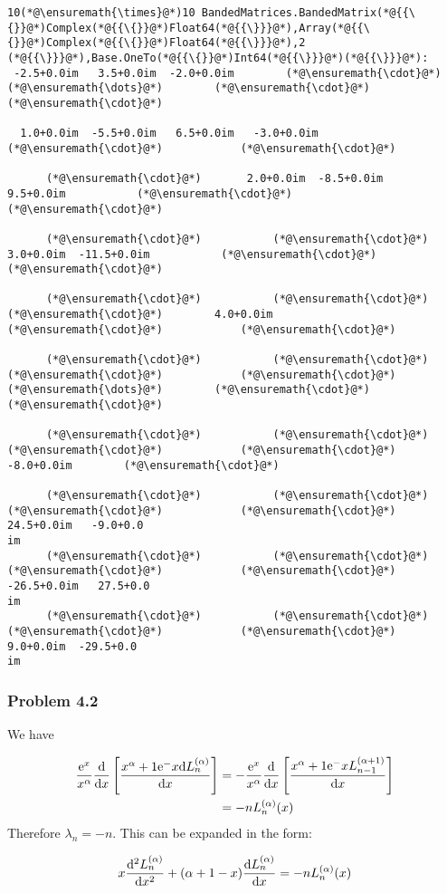 \documentclass[12pt,a4paper]{article}
\def\D{ {\rm d} }
\def\E{ {\rm e} }
\def\dx{\D x}
\def\br[#1]{\left[{#1}\right]}
\begin{document}
\begin{lstlisting}
10(*@\ensuremath{\times}@*)10 BandedMatrices.BandedMatrix(*@{{\{}}@*)Complex(*@{{\{}}@*)Float64(*@{{\}}}@*),Array(*@{{\{}}@*)Complex(*@{{\{}}@*)Float64(*@{{\}}}@*),2
(*@{{\}}}@*),Base.OneTo(*@{{\{}}@*)Int64(*@{{\}}}@*)(*@{{\}}}@*):
 -2.5+0.0im   3.5+0.0im  -2.0+0.0im        (*@\ensuremath{\cdot}@*)      (*@\ensuremath{\dots}@*)        (*@\ensuremath{\cdot}@*)            (*@\ensuremath{\cdot}@*)  
  
  1.0+0.0im  -5.5+0.0im   6.5+0.0im   -3.0+0.0im           (*@\ensuremath{\cdot}@*)            (*@\ensuremath{\cdot}@*)  
  
      (*@\ensuremath{\cdot}@*)       2.0+0.0im  -8.5+0.0im    9.5+0.0im           (*@\ensuremath{\cdot}@*)            (*@\ensuremath{\cdot}@*)  
  
      (*@\ensuremath{\cdot}@*)           (*@\ensuremath{\cdot}@*)       3.0+0.0im  -11.5+0.0im           (*@\ensuremath{\cdot}@*)            (*@\ensuremath{\cdot}@*)  
  
      (*@\ensuremath{\cdot}@*)           (*@\ensuremath{\cdot}@*)           (*@\ensuremath{\cdot}@*)        4.0+0.0im           (*@\ensuremath{\cdot}@*)            (*@\ensuremath{\cdot}@*)  
  
      (*@\ensuremath{\cdot}@*)           (*@\ensuremath{\cdot}@*)           (*@\ensuremath{\cdot}@*)            (*@\ensuremath{\cdot}@*)      (*@\ensuremath{\dots}@*)        (*@\ensuremath{\cdot}@*)            (*@\ensuremath{\cdot}@*)  
  
      (*@\ensuremath{\cdot}@*)           (*@\ensuremath{\cdot}@*)           (*@\ensuremath{\cdot}@*)            (*@\ensuremath{\cdot}@*)          -8.0+0.0im        (*@\ensuremath{\cdot}@*)  
  
      (*@\ensuremath{\cdot}@*)           (*@\ensuremath{\cdot}@*)           (*@\ensuremath{\cdot}@*)            (*@\ensuremath{\cdot}@*)          24.5+0.0im   -9.0+0.0
im
      (*@\ensuremath{\cdot}@*)           (*@\ensuremath{\cdot}@*)           (*@\ensuremath{\cdot}@*)            (*@\ensuremath{\cdot}@*)         -26.5+0.0im   27.5+0.0
im
      (*@\ensuremath{\cdot}@*)           (*@\ensuremath{\cdot}@*)           (*@\ensuremath{\cdot}@*)            (*@\ensuremath{\cdot}@*)           9.0+0.0im  -29.5+0.0
im
\end{lstlisting}


\subsubsection{Problem 4.2}
We have


\begin{align*}
{\E^x \over x^\alpha} {\D \over \dx} \br[x^{\alpha+1} \E^{-x} {\D L_n^{(\alpha)} \over \dx}] &= -{\E^x \over x^\alpha} {\D \over \dx} \br[x^{\alpha+1} \E^{-x} { L_{n-1}^{(\alpha+1)} \over \dx}] \\
&= -n L_{n}^{(\alpha)}(x)
\end{align*}
Therefore $\lambda_n = -n$. This can be expanded in the form:

\[
x {\D^2 L_n^{(\alpha)} \over \dx^2} + (\alpha+1 - x) {\D L_n^{(\alpha)} \over \dx} = -n L_n^{(\alpha)}(x)
\]
\end{document}
